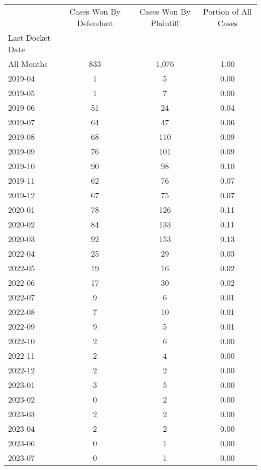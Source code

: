 \begin{tabular}{lccc}
\toprule
 & Cases Won By Defendant & Cases Won By Plaintiff & Portion of All Cases \\
Last Docket Date &  &  &  \\
\midrule
All Months & 833 & 1,076 & 1.00 \\
2019-04 & 1 & 5 & 0.00 \\
2019-05 & 1 & 7 & 0.00 \\
2019-06 & 51 & 24 & 0.04 \\
2019-07 & 64 & 47 & 0.06 \\
2019-08 & 68 & 110 & 0.09 \\
2019-09 & 76 & 101 & 0.09 \\
2019-10 & 90 & 98 & 0.10 \\
2019-11 & 62 & 76 & 0.07 \\
2019-12 & 67 & 75 & 0.07 \\
2020-01 & 78 & 126 & 0.11 \\
2020-02 & 84 & 133 & 0.11 \\
2020-03 & 92 & 153 & 0.13 \\
2022-04 & 25 & 29 & 0.03 \\
2022-05 & 19 & 16 & 0.02 \\
2022-06 & 17 & 30 & 0.02 \\
2022-07 & 9 & 6 & 0.01 \\
2022-08 & 7 & 10 & 0.01 \\
2022-09 & 9 & 5 & 0.01 \\
2022-10 & 2 & 6 & 0.00 \\
2022-11 & 2 & 4 & 0.00 \\
2022-12 & 2 & 2 & 0.00 \\
2023-01 & 3 & 5 & 0.00 \\
2023-02 & 0 & 2 & 0.00 \\
2023-03 & 2 & 2 & 0.00 \\
2023-04 & 2 & 2 & 0.00 \\
2023-06 & 0 & 1 & 0.00 \\
2023-07 & 0 & 1 & 0.00 \\
\bottomrule
\end{tabular}

